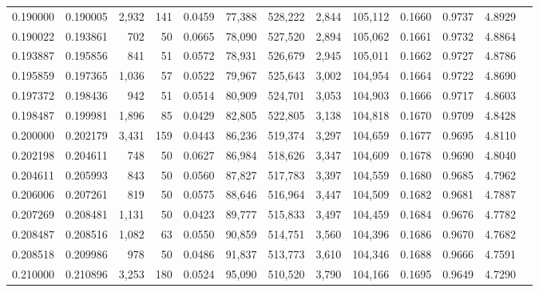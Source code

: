 \begin{tabular}{rrrrrrrrrrrrr}
0.190000 & 0.190005 & 2,932 & 141 &                                     0.0459 &  77,388 & 528,222 &   2,844 & 105,112 & 0.1660 & 0.9737 & 4.8929 \\
0.190022 & 0.193861 &   702 &  50 &                                     0.0665 &  78,090 & 527,520 &   2,894 & 105,062 & 0.1661 & 0.9732 & 4.8864 \\
0.193887 & 0.195856 &   841 &  51 &                                     0.0572 &  78,931 & 526,679 &   2,945 & 105,011 & 0.1662 & 0.9727 & 4.8786 \\
0.195859 & 0.197365 & 1,036 &  57 &                                     0.0522 &  79,967 & 525,643 &   3,002 & 104,954 & 0.1664 & 0.9722 & 4.8690 \\
0.197372 & 0.198436 &   942 &  51 &                                     0.0514 &  80,909 & 524,701 &   3,053 & 104,903 & 0.1666 & 0.9717 & 4.8603 \\
0.198487 & 0.199981 & 1,896 &  85 &                                     0.0429 &  82,805 & 522,805 &   3,138 & 104,818 & 0.1670 & 0.9709 & 4.8428 \\
0.200000 & 0.202179 & 3,431 & 159 &                                     0.0443 &  86,236 & 519,374 &   3,297 & 104,659 & 0.1677 & 0.9695 & 4.8110 \\
0.202198 & 0.204611 &   748 &  50 &                                     0.0627 &  86,984 & 518,626 &   3,347 & 104,609 & 0.1678 & 0.9690 & 4.8040 \\
0.204611 & 0.205993 &   843 &  50 &                                     0.0560 &  87,827 & 517,783 &   3,397 & 104,559 & 0.1680 & 0.9685 & 4.7962 \\
0.206006 & 0.207261 &   819 &  50 &                                     0.0575 &  88,646 & 516,964 &   3,447 & 104,509 & 0.1682 & 0.9681 & 4.7887 \\
0.207269 & 0.208481 & 1,131 &  50 &                                     0.0423 &  89,777 & 515,833 &   3,497 & 104,459 & 0.1684 & 0.9676 & 4.7782 \\
0.208487 & 0.208516 & 1,082 &  63 &                                     0.0550 &  90,859 & 514,751 &   3,560 & 104,396 & 0.1686 & 0.9670 & 4.7682 \\
0.208518 & 0.209986 &   978 &  50 &                                     0.0486 &  91,837 & 513,773 &   3,610 & 104,346 & 0.1688 & 0.9666 & 4.7591 \\
0.210000 & 0.210896 & 3,253 & 180 &                                     0.0524 &  95,090 & 510,520 &   3,790 & 104,166 & 0.1695 & 0.9649 & 4.7290 \\

\end{tabular}
